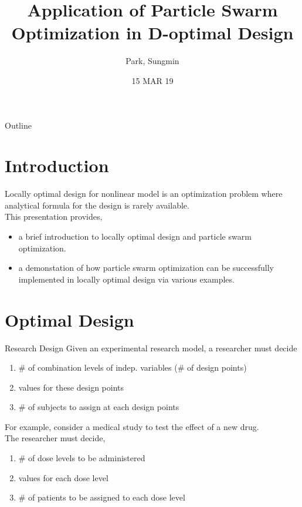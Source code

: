 \documentclass{beamer}
\title{Application of Particle Swarm Optimization in D-optimal Design}
\author{Park, Sungmin}
\institute[SNU] %
{
  Department of Statistics\\
  Seoul National University
}
\date{15 MAR 19}
\begin{document}
\begin{frame}
  \titlepage
\end{frame}

\begin{frame}{Outline}
  \tableofcontents
\end{frame}


\section{Introduction}
\begin{frame}
  Locally optimal design for nonlinear model is an optimization problem where analytical formula for the design is rarely available.\\
  \vspace{3mm}
  This presentation provides,
  \begin{itemize}
    \item a brief introduction to locally optimal design and particle swarm optimization.
    \item a demonstation of how particle swarm optimization can be successfully implemented in locally optimal design via various examples.
  \end{itemize}
\end{frame}

\section{Optimal Design}


\begin{frame}{Research Design}%
  Given an experimental research model, a researcher must decide\\
  \begin{enumerate}
    \item \# of combination levels of indep. variables (\# of design points)
    \item values for these design points
    \item \# of subjects to assign at each design points
  \end{enumerate}
  \vspace{3mm}
  For example, consider a medical study to test the effect of a new drug.\\
  The researcher must decide,
  \begin{enumerate}
    \item \# of dose levels to be administered
    \item values for each dose level
    \item \# of patients to be assigned to each dose level
  \end{enumerate}
\end{frame}
\end{document}
